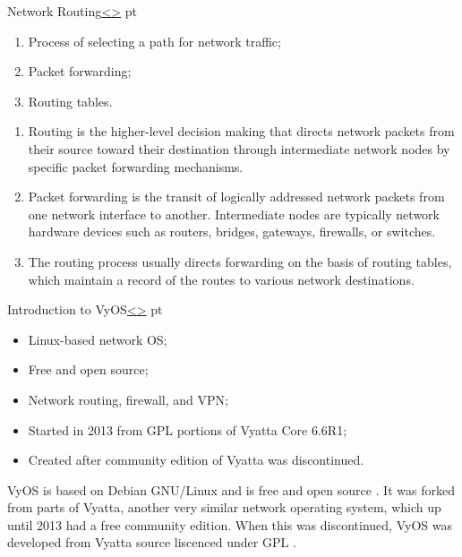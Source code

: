 \documentclass[12pt]{article}
\newenvironment{instructionblock}{\Large\bgroup}{\egroup}
\begin{document}
\pagebreak
\begin{slide}{Network Routing}{\hyperref[slide 6]{\textless}\hyperref[slide 8]{\textgreater}}
	 pt
	\begin{instructionblock}
		\begin{enumerate}
		\item Process of selecting a path for network traffic;
        \item Packet forwarding;
        \item Routing tables.
		\end{enumerate}
	\end{instructionblock}
\end{slide}
\begin{enumerate}
\item Routing is the higher-level decision making that directs network packets from their source toward their destination through intermediate network nodes by specific packet forwarding mechanisms.
\item  Packet forwarding is the transit of logically addressed network packets from one network interface to another. Intermediate nodes are typically network hardware devices such as routers, bridges, gateways, firewalls, or switches.
\item The routing process usually directs forwarding on the basis of routing tables, which maintain a record of the routes to various network destinations.
\end{enumerate}


\pagebreak
\begin{slide}{Introduction to VyOS}{\hyperref[slide 7]{\textless}\hyperref[slide 9]{\textgreater}}
	 pt
	\begin{instructionblock}
		\begin{itemize}
        \item Linux-based network OS;
        \item Free and open source;
        \item Network routing, firewall, and VPN;
        \item Started in 2013 from GPL portions of Vyatta Core 6.6R1;
        \item Created after community edition of Vyatta was discontinued.
		\end{itemize}
	\end{instructionblock}
\end{slide}
\par VyOS is based on Debian GNU/Linux and is free and open source \cite{vyoswiki}. It was forked from parts of Vyatta, another very similar network operating system, which up until 2013 had a free community edition. When this was discontinued, VyOS was developed from Vyatta source liscenced under GPL \cite{vyoswiki}.
\end{document}
